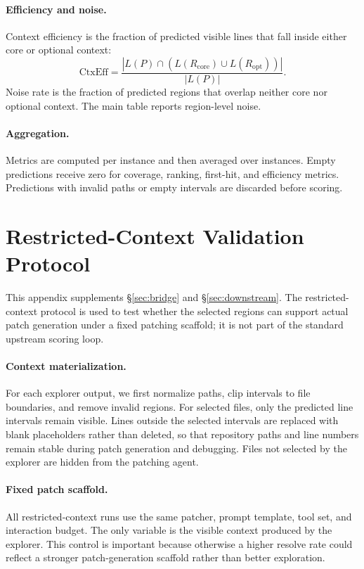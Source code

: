 \documentclass{llmxive}
\begin{document}
\paragraph{Efficiency and noise.}
Context efficiency is the fraction of predicted visible lines that fall inside
either core or optional context:
\[
\mathrm{CtxEff}
=
\frac{
|L(P)\cap (L(R_{\mathrm{core}})\cup L(R_{\mathrm{opt}}))|
}{
|L(P)|
}.
\]
Noise rate is the fraction of predicted regions that overlap neither core nor
optional context. The main table reports region-level noise.

\paragraph{Aggregation.}
Metrics are computed per instance and then averaged over instances. Empty
predictions receive zero for coverage, ranking, first-hit, and efficiency
metrics. Predictions with invalid paths or empty intervals are discarded before
scoring.


\section{Restricted-Context Validation Protocol}
\label{app:bridge}
\label{app:restricted_context}

This appendix supplements \S\ref{sec:bridge} and \S\ref{sec:downstream}. The
restricted-context protocol is used to test whether the selected regions can
support actual patch generation under a fixed patching scaffold; it is not part
of the standard upstream scoring loop.

\paragraph{Context materialization.}
For each explorer output, we first normalize paths, clip intervals to file
boundaries, and remove invalid regions. For selected files, only the predicted
line intervals remain visible. Lines outside the selected intervals are replaced
with blank placeholders rather than deleted, so that repository paths and line
numbers remain stable during patch generation and debugging. Files not selected
by the explorer are hidden from the patching agent.

\paragraph{Fixed patch scaffold.}
All restricted-context runs use the same patcher, prompt template, tool set, and
interaction budget. The only variable is the visible context produced by the
explorer. This control is important because otherwise a higher resolve rate
could reflect a stronger patch-generation scaffold rather than better
exploration.
\end{document}
